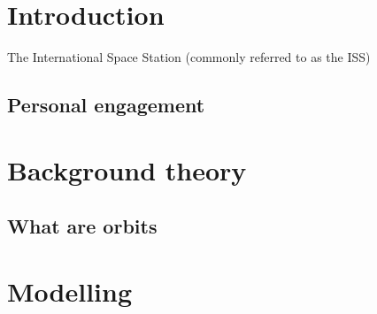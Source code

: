 \documentclass[12pt]{article}
\begin{document}
    \tableofcontents
    \thispagestyle{empty}
    \newpage
    
 
    \addtocounter{page}{-1}
    \section{Introduction} %
    The International Space Station (commonly referred to as the ISS)
        \subsection{Personal engagement}



    \section{Background theory}
        \subsection{What are orbits}
    \section{Modelling}

    
\end{document}
